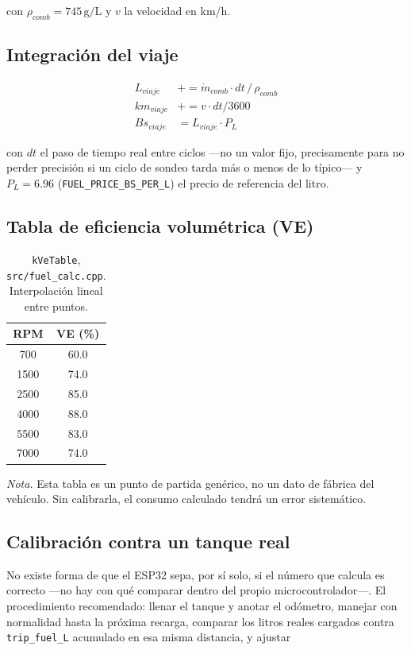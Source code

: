 con $\rho_{comb} = 745\,\text{g/L}$ y $v$ la velocidad en km/h.

\subsection{Integración del viaje}

\begin{align}
L_{viaje} &\mathrel{+}= \dot{m}_{comb} \cdot dt \,/\, \rho_{comb} \\
km_{viaje} &\mathrel{+}= v \cdot dt / 3600 \\
Bs_{viaje} &= L_{viaje} \cdot P_{L}
\end{align}

con $dt$ el paso de tiempo real entre ciclos —no un valor fijo, precisamente
para no perder precisión si un ciclo de sondeo tarda más o menos de lo
típico— y $P_L = 6.96$ (\texttt{FUEL\_PRICE\_BS\_PER\_L}) el precio de
referencia del litro.

\subsection{Tabla de eficiencia volumétrica (VE)}
\label{sec:ve}

\begin{table}[H]
\centering
\caption{\texttt{kVeTable}, \texttt{src/fuel\_calc.cpp}. Interpolación lineal entre puntos.}
\begin{tabular}{@{}cc@{}}
\toprule
RPM & VE (\%) \\
\midrule
700  & 60.0 \\
1500 & 74.0 \\
2500 & 85.0 \\
4000 & 88.0 \\
5500 & 83.0 \\
7000 & 74.0 \\
\bottomrule
\end{tabular}
\end{table}

\textit{Nota.} Esta tabla es un punto de partida genérico, no un dato de
fábrica del vehículo. Sin calibrarla, el consumo calculado tendrá un error
sistemático.

\subsection{Calibración contra un tanque real}
\label{sec:calibracion}
No existe forma de que el ESP32 sepa, por sí solo, si el número que calcula
es correcto —no hay con qué comparar dentro del propio microcontrolador—.
El procedimiento recomendado: llenar el tanque y anotar el odómetro, manejar
con normalidad hasta la próxima recarga, comparar los litros reales cargados
contra \texttt{trip\_fuel\_L} acumulado en esa misma distancia, y ajustar

